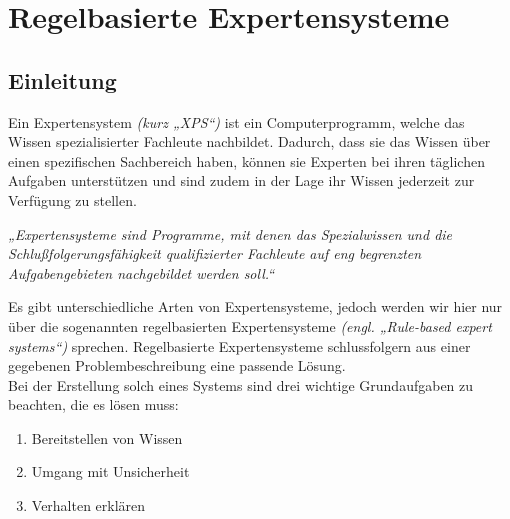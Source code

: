 
\chapter{Regelbasierte Expertensysteme}



\section{Einleitung}
Ein Expertensystem \textit{(kurz „XPS“)} ist ein Computerprogramm, welche das Wissen spezialisierter Fachleute nachbildet. Dadurch, dass sie das Wissen über einen spezifischen Sachbereich haben, können sie Experten bei ihren täglichen Aufgaben unterstützen und sind zudem in der Lage ihr Wissen jederzeit zur Verfügung zu stellen.

\begin{center}
    \textit{
        „Expertensysteme sind Programme, mit denen das Spezialwissen und die Schlußfolgerungsfähigkeit qualifizierter Fachleute auf eng begrenzten Aufgabengebieten nachgebildet werden soll.“
    }\cite{puppe}\\
\end{center}

\noindent Es gibt unterschiedliche Arten von Expertensysteme, jedoch werden wir hier nur über die sogenannten regelbasierten Expertensysteme \textit{(engl. „Rule-based expert systems“)} sprechen.
Regelbasierte Expertensysteme schlussfolgern aus einer gegebenen Problembeschreibung eine passende Lösung.\\
Bei der Erstellung solch eines Systems sind drei wichtige Grundaufgaben zu beachten, die es lösen muss:\\

\begin{enumerate}[label=\textbf{\arabic*}.]
    \item Bereitstellen von Wissen
    \item Umgang mit Unsicherheit
    \item Verhalten erklären
\end{enumerate}



